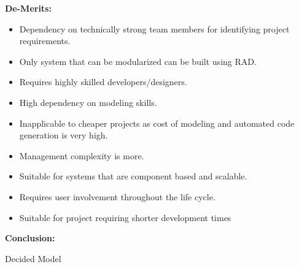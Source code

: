 \documentclass{article}
\begin{document}
\textbf{De-Merits:} 
\begin{itemize}
\item	Dependency on technically strong team members for identifying project requirements.
\item	Only system that can be modularized can be built using RAD.
\item	Requires highly skilled developers/designers.
\item	High dependency on modeling skills.
\item	Inapplicable to cheaper projects as cost of modeling and automated code generation is very high.
\item	Management complexity is more.
\item	Suitable for systems that are component based and scalable.
\item	Requires user involvement throughout the life cycle.
\item	Suitable for project requiring shorter development times

 \end{itemize}

\large{\textbf{Conclusion:}}

Decided Model 
\end{document}
